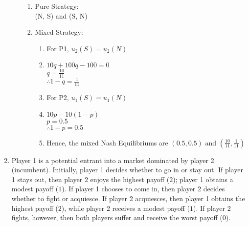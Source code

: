 \documentclass[11pt]{article}
\begin{document}
\begin{enumerate}
\begin{enumerate}
\begin{figure}[h!]
\begin{center}
\begin{tikzpicture}[scale=0.6]
	\end{tikzpicture}
\end{center}
    \end{figure}
    \begin{enumerate}
        \item Pure Strategy:\\
        (N, S) and (S, N)
        \item Mixed Strategy:
        \begin{enumerate}
            \item For P1, $u_2(S) = u_2(N)$
            \item $10q +100q - 100  = 0$\\
            $q = \frac{10}{11}$\\
            $\therefore 1 - q = \frac{1}{11}$
            \item For P2, $u_1(S) = u_1(N)$
            \item $10p - 10(1-p)$\\
            $p = 0.5$\\
            $\therefore 1-p = 0.5$
            \item Hence, the mixed Nash Equilibriums are $(0.5, 0.5)$ and $(\frac{10}{11}, \frac{1}{11})$
        \end{enumerate}
    \end{enumerate}

	\end{enumerate}

\item Player 1 is a potential entrant into a market dominated by player 2 (incumbent). Initially, player 1 decides whether to go in or stay out. If player 1 stays out, then player 2 enjoys the highest payoff ($2$); player 1 obtains a modest payoff ($1$). If player 1 chooses to come in, then player 2 decides whether to fight or acquiesce. If player 2 acquiesces, then player 1 obtains the highest payoff ($2$), while player 2 receives a modest payoff ($1$). If player 2 fights, however, then both players suffer and receive the worst payoff ($0$).

\begin{center}
\end{center}
\end{enumerate}
\end{document}

